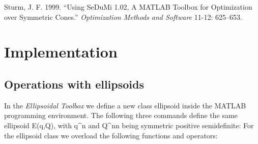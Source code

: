 \documentclass[letterpaper,10pt,english]{sphinxmanual}
\begin{document}
Sturm, J. F. 1999. “Using SeDuMi 1.02, A MATLAB Toolbox for Optimization
over Symmetric Cones.” \emph{Optimization Methods and Software} 11-12:
625–653.


\chapter{Implementation}
\label{chap_implement:implementation}\label{chap_implement::doc}

\section{Operations with ellipsoids}
\label{chap_implement:operations-with-ellipsoids}
In the \emph{Ellipsoidal Toolbox} we define a new class ellipsoid inside the
MATLAB programming environment. The following three commands define the
same ellipsoid {\mathcal E}(q,Q), with q^n and
Q^{n\times n} being symmetric positive semidefinite:
For the ellipsoid class we overload the following functions and
operators:
\end{document}
